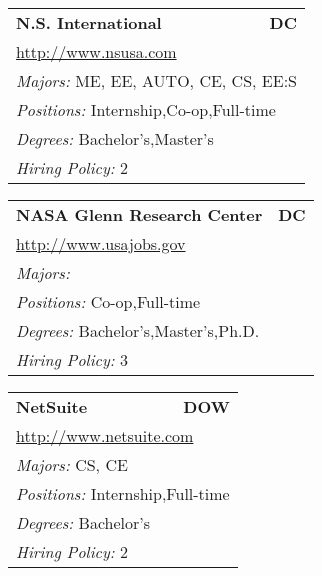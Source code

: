 \documentclass[twoside]{article}
\begin{document}
\begin{center}
\begin{multicols}{3}
\begin{FlushLeft}
\begin{minipage}{\columnwidth}
\end{minipage}
 
\begin{minipage}{\columnwidth}\begin{tabularx}{.95\columnwidth}{Xr}
                 {\Large\bf N.S. International} & {\Large\bf DC}\\
    \multicolumn{2}{p{.95\columnwidth}}{\url{http://www.nsusa.com}}\\
    \multicolumn{2}{p{.95\columnwidth}}{\emph{Majors:} ME, EE, AUTO, CE, CS, EE:S}\\
    \multicolumn{2}{p{.95\columnwidth}}{\emph{Positions:} Internship,Co-op,Full-time}\\
    \multicolumn{2}{p{.95\columnwidth}}{\emph{Degrees:} Bachelor's,Master's}\\
    \multicolumn{2}{p{.95\columnwidth}}{\emph{Hiring Policy:} 2}\\
    \end{tabularx}
    
\end{minipage}
 
\begin{minipage}{\columnwidth}\begin{tabularx}{.95\columnwidth}{Xr}
                 {\Large\bf NASA Glenn Research Center} & {\Large\bf DC}\\
    \multicolumn{2}{p{.95\columnwidth}}{\url{http://www.usajobs.gov}}\\
    \multicolumn{2}{p{.95\columnwidth}}{\emph{Majors:} }\\
    \multicolumn{2}{p{.95\columnwidth}}{\emph{Positions:} Co-op,Full-time}\\
    \multicolumn{2}{p{.95\columnwidth}}{\emph{Degrees:} Bachelor's,Master's,Ph.D.}\\
    \multicolumn{2}{p{.95\columnwidth}}{\emph{Hiring Policy:} 3}\\
    \end{tabularx}
    
\end{minipage}
 
\begin{minipage}{\columnwidth}\begin{tabularx}{.95\columnwidth}{Xr}
                 {\Large\bf NetSuite} & {\Large\bf DOW}\\
    \multicolumn{2}{p{.95\columnwidth}}{\url{http://www.netsuite.com}}\\
    \multicolumn{2}{p{.95\columnwidth}}{\emph{Majors:} CS, CE}\\
    \multicolumn{2}{p{.95\columnwidth}}{\emph{Positions:} Internship,Full-time}\\
    \multicolumn{2}{p{.95\columnwidth}}{\emph{Degrees:} Bachelor's}\\
    \multicolumn{2}{p{.95\columnwidth}}{\emph{Hiring Policy:} 2}\\
    \end{tabularx}
    

\end{minipage}
\end{FlushLeft}
\end{multicols}
\end{center}
\end{document}
